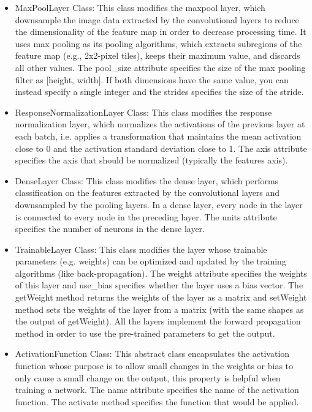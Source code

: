 \documentclass[parskip=full]{scrartcl}
\begin{document}
\begin{itemize}
\begin{itemize}
	\item MaxPoolLayer Class: This class modifies the maxpool layer, which downsample the image data extracted by the convolutional layers to reduce the dimensionality of the feature map in order to decrease processing time. It uses max pooling as its pooling algorithms, which extracts subregions of the feature map (e.g., 2x2-pixel tiles), keeps their maximum value, and discards all other values.
The pool_size attribute specifies the size of the max pooling filter as [height, width]. If both dimensions have the same value, you can instead specify a single integer and the strides specifies the size of the stride.
	\item ResponseNormalizationLayer Class: This class modifies the response normalization layer, which normalizes the activations of the previous layer at each batch, i.e. applies a transformation that maintains the mean activation close to 0 and the activation standard deviation close to 1. The axis attribute specifies the axis that should be normalized (typically the features axis).
	\item DenseLayer Class: This class modifies the dense layer, which performs classification on the features extracted by the convolutional layers and downsampled by the pooling layers. In a dense layer, every node in the layer is connected to every node in the preceding layer.
The units attribute specifies the number of neurons in the dense layer.
	\item TrainableLayer Class: This class modifies the layer whose trainable parameters (e.g. weights) can be optimized and updated by the training algorithms (like back-propagation). The weight attribute specifies the weights of this layer and use\_bias specifies whether the layer uses a bias vector. The getWeight method returns the weights of the layer as a matrix and setWeight method sets the weights of the layer from a matrix (with the same shapes as the output of getWeight). All the layers implement the forward propagation method in order to use the pre-trained parameters to get the output. 
	\item ActivationFunction Class: This abstract class encapsulates the activation function whose purpose is to allow small changes in the weights or bias to only cause a small change on the output, this property is helpful when training a network.
The name attribute specifies the name of the activation function.
The activate method specifies the function that would be applied.
\end{itemize}




\end{itemize}
\end{document}
